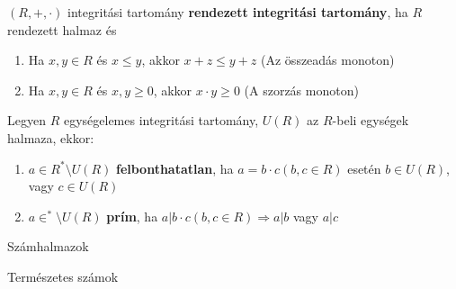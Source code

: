 \begin{frame}
  \begin{tcolorbox}[title={Def.: Rendezett Integritási Tartomány}]
    $(R, +, {\cdot})$ integritási tartomány \textbf{rendezett integritási tartomány}, ha $R$ rendezett halmaz és\\
    \begin{enumerate}
      \item Ha $x, y \in R$ és $x \leq y$, akkor $x + z \leq y + z$ (Az összeadás monoton)
      \item Ha $x, y \in R$ és $x, y \geq 0$, akkor $x \cdot y \geq 0$ (A szorzás monoton)
    \end{enumerate}
  \end{tcolorbox}

  \begin{tcolorbox}[title={Def.: Felbonthatatlan, Prím}]
    Legyen $R$ egységelemes integritási tartomány, $U(R)$ az $R$-beli egységek halmaza, ekkor:\\
    \begin{enumerate}
      \item $a \in R^* \setminus U(R)$ \textbf{felbonthatatlan}, ha $a = b \cdot c (b, c \in R)$ esetén $b \in U(R)$, vagy $c \in U(R)$
      \item $a \in ^* \setminus U(R)$ \textbf{prím}, ha $a | b \cdot c (b, c \in R) \Rightarrow a|b$ vagy $a|c$
    \end{enumerate}
  \end{tcolorbox}
\end{frame}



\begin{frame}[plain]
\begin{tcolorbox}[center, colback={myyellow}, coltext={black}, colframe={myyellow}]
    {\Huge Számhalmazok}
    \mmedskip
\end{tcolorbox}
\end{frame}


\begin{frame}
\begin{tcolorbox}
{\Huge Természetes számok}
\end{tcolorbox}
\end{frame}

